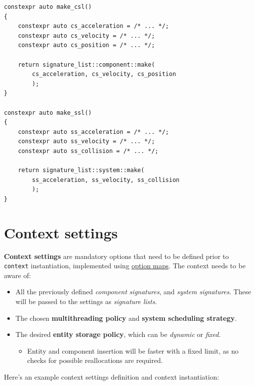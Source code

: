 \documentclass[twoside, 12pt, a4paper, openany]{book}
\providecommand{\tightlist}{%
  \setlength{\itemsep}{0pt}\setlength{\parskip}{0pt}}
\begin{document}
\begin{verbatim}
constexpr auto make_csl()
{
    constexpr auto cs_acceleration = /* ... */;
    constexpr auto cs_velocity = /* ... */;
    constexpr auto cs_position = /* ... */;

    return signature_list::component::make(
        cs_acceleration, cs_velocity, cs_position
        );
}

constexpr auto make_ssl()
{
    constexpr auto ss_acceleration = /* ... */;
    constexpr auto ss_velocity = /* ... */;
    constexpr auto ss_collision = /* ... */;

    return signature_list::system::make(
        ss_acceleration, ss_velocity, ss_collision
        );
}
\end{verbatim}

\section{Context settings}\label{context-settings}

\textbf{Context settings} are mandatory options that need to be defined
prior to
\texttt{context}
instantiation, implemented using
\protect\hyperlink{metaprogramming_option_maps}{option maps}. The
context needs to be aware of:

\begin{itemize}
\item
  All the previously defined \emph{component signatures}, and
  \emph{system signatures}. These will be passed to the settings as
  \emph{signature lists}.
\item
  The chosen \textbf{multithreading policy} and \textbf{system
  scheduling strategy}.
\item
  The desired \textbf{entity storage policy}, which can be
  \emph{dynamic} or \emph{fixed}.

  \begin{itemize}
  \tightlist
  \item
    Entity and component insertion will be faster with a fixed limit, as
    no checks for possible reallocations are required.
  \end{itemize}
\end{itemize}

Here's an example context settings definition and context instantiation:
\end{document}
